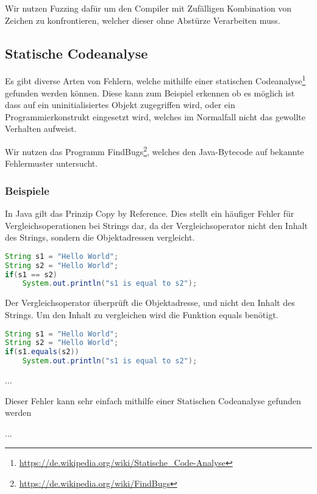 Wir nutzen Fuzzing daf\"ur um den Compiler mit Zuf\"alligen Kombination von Zeichen zu konfrontieren, welcher dieser ohne Abst\"urze Verarbeiten muss.

\subsection{Statische Codeanalyse}

Es gibt diverse Arten von Fehlern, welche mithilfe einer statischen Codeanalyse\footnote{\url{https://de.wikipedia.org/wiki/Statische_Code-Analyse}} gefunden werden k\"onnen. Diese kann zum Beispiel erkennen ob es m\"oglich ist dass auf ein uninitialisiertes Objekt zugegriffen wird, oder ein Programmierkonstrukt eingesetzt wird, welches im Normalfall nicht das gewollte Verhalten aufweist.

Wir nutzen das Programm FindBugs\footnote{\url{https://de.wikipedia.org/wiki/FindBugs}}, welches den Java-Bytecode auf bekannte Fehlermuster untersucht.

\subsubsection{Beispiele}


In Java gilt das Prinzip Copy by Reference. Dies stellt ein h\"aufiger Fehler f\"ur Vergleichsoperationen bei Strings dar, da der Vergleichsoperator nicht den Inhalt des Strings, sondern die Objektadressen vergleicht.

\begin{lstlisting}[language=Java]
String s1 = "Hello World";
String s2 = "Hello World";
if(s1 == s2)
	System.out.println("s1 is equal to s2");
\end{lstlisting}

Der Vergleichsoperator \"uberpr\"uft die Objektadresse, und nicht den Inhalt des Strings. Um den Inhalt zu vergleichen wird die Funktion equals ben\"otigt.

\begin{lstlisting}[language=Java]
String s1 = "Hello World";
String s2 = "Hello World";
if(s1.equals(s2))
	System.out.println("s1 is equal to s2");
\end{lstlisting}


...

Dieser Fehler kann sehr einfach mithilfe einer Statischen Codeanalyse gefunden werden

...